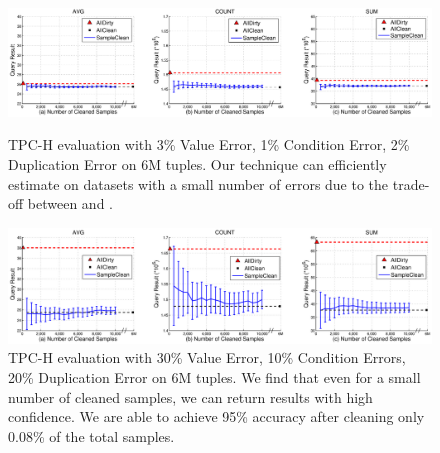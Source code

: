 \begin{figure}[t]\vspace{-2em}
\centering
\hspace*{-2em}\includegraphics[scale=0.35]{exp/pk-alldirty-small-errors.eps}\vspace{-1em}
\caption{TPC-H evaluation with 3\% Value Error, 1\% Condition Error, 2\% Duplication Error on 6M tuples.
Our technique can efficiently estimate on datasets with a small number of errors due to the trade-off between \sampleclean and \bias.}
\label{exp:end-to-end-small}
\centering\vspace{.5em}
\hspace*{-2em}\includegraphics[scale=0.35]{exp/pk-alldirty.eps}\vspace{-1em}
\caption{TPC-H evaluation with 30\% Value Error, 10\% Condition Errors, 20\% Duplication Error on 6M tuples.
We find that even for a small number of cleaned samples, we can return results with high confidence.
We are able to achieve 95\% accuracy after cleaning only 0.08\% of the total samples.
}
\label{exp:end-to-end}
\end{figure}



